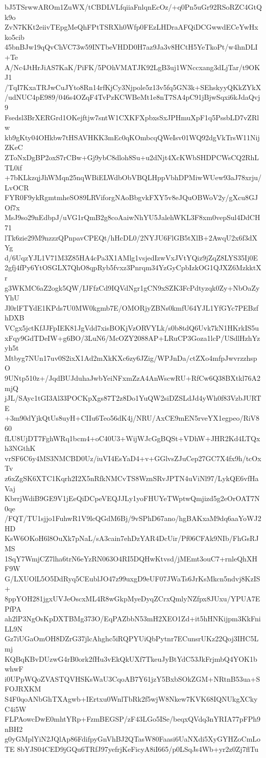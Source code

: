 bJ5TSrwwAROm1ZuWX/tCBDLVLfqiiaFnlqnEcOz/+q0Pn5uGr92RSoRZC4GtQk9o
ZvN7KKt2eiivTEpgMeQhFPtTSRXh0Wfp0FEzLHDraAFQiDCGwwdECeYwHxko5cib
45bnBJw19qQvChVC73w59INTbeVHDD0H7az9Ja3v8HCtH5YeTkoPt/w4hnDLI+Te
A/Nc4JtHrJiAS7KaK/PiFK/5POhVMATJK92LgB3uj1WNccxang3dLjTar/t9OKJ1
/TqI7KxaTRJwCuJYto8Rn14rfKjCy3Njpole5z13v5fq5GN3k+SEhskyyQKkZYkX
/udNUC4pE989/046s4OZqF4TvPzKCWBeMt1e8nT7SA4pC91jBjwSqxi6kJdaQvj9
Fsedsl3BrXERGrd1OKejftjw7sntW1CXKFXpbxsSxJPHmuXpF1q5PssbLD7vZRlw
kb9gKty04OHkbw7tHSAVHKK3mEc0qKOmbcqQWeIsv01WQ92dgVkTrsW11NijZKeC
ZToNxDgBP2oxS7rCBw+Gj9ybC8dloh8Su+u2dNjt4XcKWbSHDPCWsCQ2RhLTL0if
+7bKLkzqjJhWMqn25nqWBiELWdbObVBQLHppVbhDPMiwWUew93aJ78xrju/LvOCR
FYR0F9ykRgmtmheSO89LRViforgNAoBbgvkFXY5v8eJQuOBWoV2y/gXcu8GJOf7x
MsJ9so29nEdbpJ/uVG1rQmB2g8coAaiwNhYU5JalehWKL3F8xm0vepSul4DdCH71
lTk6zie29M9nzzzQPnpavCPEQt/hHcDL0/2NYJU6FlGB5tXlB+2AwqU2x6f3dXYg
d/6UqzYJL1V71M3Z85HA4cPa3X1AMlg1vsjedIzwVxJVtYQiz9jZqZ8LYS35Ij0E
2gfj4fPy6YtOSGLX7QhO8qpRyb5fvxz3Pnrqm34YzGyCpbIzkOG1QJXZ6MzkktXr
g3WKMC6aZ2ogk5QW/IJFfzCd9IQVdNgr1gCN9xSZK3FcPdtyzqk0Zy+NbOaZyYhU
Jl0rlFTYdE1KPds7U0MW0kgmb7E/OMORjyZBNs0kmfU64YJL1YfGYc7PEBzfhDXB
VCgx5jctKfJJFpIEK81JgVdd7xisBOKjVzORVYLk/s0b8tdQ6Uvk7kN1HKrkIS5u
xFqy9GdTDeIW+g6BO/3LuN6/McOZY2088AP+LRuCP3Goza1lcP/USdlHzhYzyh5t
Mtbyg7NUn17uv0S2ixX1Ad2mXkKXc6zy6JZig/WPJnDa/ctZXo4mfpJwvrzzhspO
9UNtp510z+/JqdBUJduhaJwbYeiNFxmZzA4AnWscwRU+RfCw6Q38BXtkl76A2mjQ
jJL/SAyc1tGI3Al33POCKpXgs87T2z8Do1YuQW2siDZSLdJd4yWh0f83VzbJURTE
+3m90dYjkQtUs8uyH+CIIu6Teo56dK4j/NRU/AxCE9mEN5rveYX1egpeo/RiV860
fLU8UjDT7FghWRq1bcm4+oC40U3+WijWJcGgBQSt+VDhW+JHR2Kd4LTQxh3NGthK
vrSF6C6y4MS3NMCBD0Uz/iuVI4EsYaD4+v+GGlvsZJuCep27GC7X4fx9h/tcOxTv
z6xZgSK6XTC1Kqrh2I2X5nRfkNMCvTS8WznSRvJPTN4uViNl97/LykQE6vfHaVaj
KbrrjWdiB9GE9V1jEeQiDCpeVEQJJLy1yoFHUYeTWptwQmjizd5g2eOrOAT7N0qe
/FQT/TU1sjjo1FuhwR1V9lcQGdM6Bj/9vSPhD67ano/hgBAKxaM9dq6aaYoWJ2HD
KsW6OKoH6l8OuXk7pNaL/sA3cain7ehDzYAR4DcUir/Pf06CFAk9NIb/FhGsRJMS
1SqY7WmjCZ7lha6trN6eYzRN063O4RI5DQHwKtvsd/jMEmt3ouC7+rnleQhXHF9W
G/LXUOlL5O5DdRyq5CEublJO47z99uxgD9eUF07JWaTs6JrKsMkcn5ndvj8KzIS+
8ppYOH281jgxUVJeOscxML4R8wGkpMyeDyqZCrxQmlyNZfpx8JUxu/YPUA7EPfPA
ah2lP3NgOsKpDXTBMg373O/EqPAZbbN53mH2XEO1Zd+it5hHNKijpm3KkFniLL9N
Gz7iUGaOmOH8DZrG37jlcAhghc5iRQPYUiQbPytnr7ECunsrUKz22Qoj3IHC5Lmj
KQBqKBvDUzwG4rB0ork2fHu3vEkQkUXf7TkeuJyBtYdC53JkFrjmbQ4YOK1bwhwF
i0UPpWQoZVASTQVHSKsWaU3CqoAB7Y61jzY5BxbSOkZGM+NRtnB53ua+SFOJRXKM
S4F0qoANbGhTXAgwb+IErtxu0WnlTbRk2f5wjW8Nkew7KVK68IQNUkgXCkyC4i5W
FLPAowcDwE0mhtYRp+FzmBEGSP/zF43LGo5ISe/beqxQVdq3nYRIA77pFPh9nBH2
g0yGMplYiN2JQlAp86FdifpyGnVhBJ2QTasW80Faasi6UaNXdi5XyGYHZoCmLoTE
8bYJS04CED9jGQu6TRfJ97yefrjKeFicyA8iI665/p0LSqJs4Wb+yr2z0Zj7flTu
